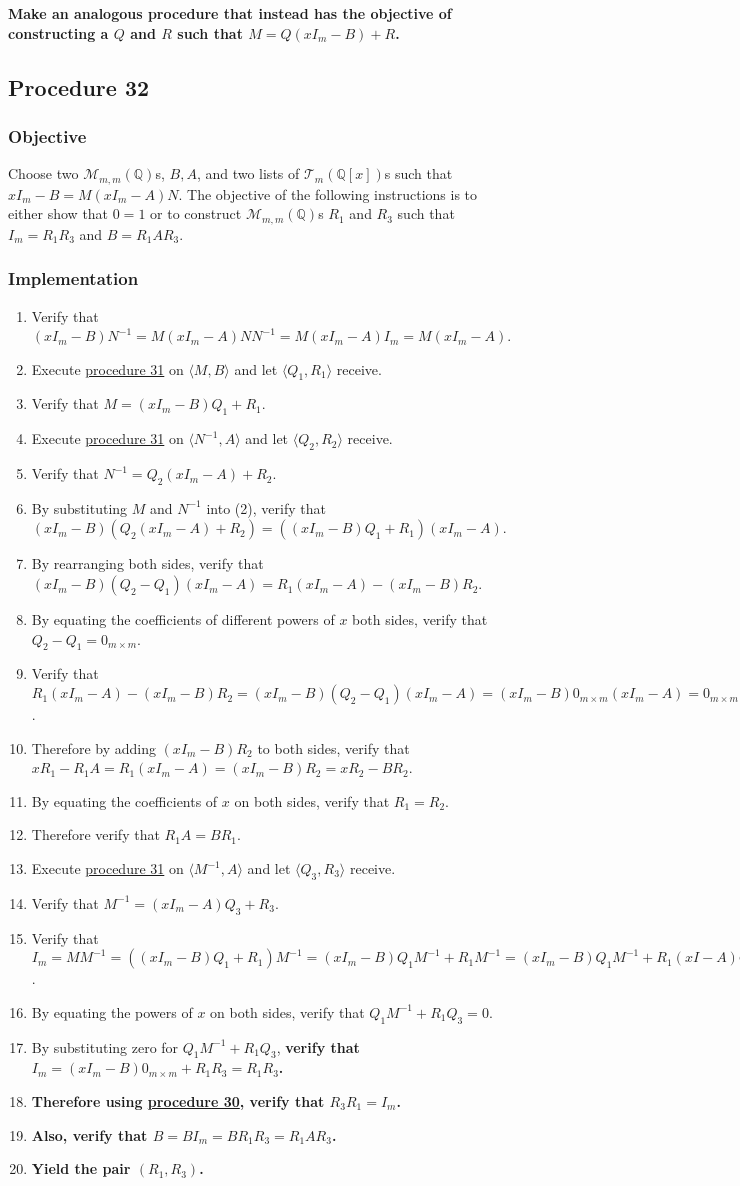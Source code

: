 \documentclass[twocolumn]{article}
\newcommand{\procedure}[2][]{\subsection*{Procedure #2 \ifthenelse{\equal{#1}{}}{}{(#1)}}\label{sec:procedure #2}}
\newcommand{\objective}{\subsubsection*{Objective}}
\newcommand{\implementation}{\subsubsection*{Implementation}}
\begin{document}
			\textbf{Make an analogous procedure that instead has the objective of constructing a $Q$ and $R$ such that $M=Q(xI_m-B)+R$.}
		\procedure{32}
			\objective
				Choose two $\mathcal{M}_{m,m}(\mathbb{Q})$s, $B,A$, and two lists of $\mathcal{T}_{m}(\mathbb{Q}[x])$s such that $xI_m-B=M(xI_m-A)N$. The objective of the following instructions is to either show that $0=1$ or to construct $\mathcal{M}_{m,m}(\mathbb{Q})$s $R_1$ and $R_3$ such that $I_m=R_1R_3$ and $B=R_1AR_3$.
			\implementation
				\begin{enumerate}
					\item Verify that $(xI_m-B)N^{-1}=M(xI_m-A)NN^{-1}=M(xI_m-A)I_m=M(xI_m-A)$.
					\item Execute \hyperref[sec:procedure 31]{procedure 31} on $\langle M,B\rangle$ and let $\langle Q_1,R_1\rangle$ receive.
					\item Verify that $M=(xI_m-B)Q_1+R_1$.
					\item Execute \hyperref[sec:procedure 31]{procedure 31} on $\langle N^{-1},A\rangle$ and let $\langle Q_2,R_2\rangle$ receive.
					\item Verify that $N^{-1}=Q_2(xI_m-A)+R_2$.
					\item By substituting $M$ and $N^{-1}$ into (2), verify that $(xI_m-B)(Q_2(xI_m-A)+R_2)=((xI_m-B)Q_1+R_1)(xI_m-A)$.
					\item By rearranging both sides, verify that $(xI_m-B)(Q_2-Q_1)(xI_m-A)=R_1(xI_m-A)-(xI_m-B)R_2$.
					\item By equating the coefficients of different powers of $x$ both sides, verify that $Q_2-Q_1=0_{m\times m}$.
					\item Verify that $R_1(xI_m-A)-(xI_m-B)R_2=(xI_m-B)(Q_2-Q_1)(xI_m-A)=(xI_m-B)0_{m\times m}(xI_m-A)=0_{m\times m}$.
					\item Therefore by adding $(xI_m-B)R_2$ to both sides, verify that $xR_1-R_1A=R_1(xI_m-A)=(xI_m-B)R_2=xR_2-BR_2$.
					\item By equating the coefficients of $x$ on both sides, verify that $R_1=R_2$.
					\item Therefore verify that $R_1A=BR_1$.
					\item Execute \hyperref[sec:procedure 31]{procedure 31} on $\langle M^{-1},A\rangle$ and let $\langle Q_3,R_3\rangle$ receive.
					\item Verify that $M^{-1}=(xI_m-A)Q_3+R_3$.
					\item Verify that $I_m=MM^{-1}=((xI_m-B)Q_1+R_1)M^{-1}=(xI_m-B)Q_1M^{-1}+R_1M^{-1}=(xI_m-B)Q_1M^{-1}+R_1(xI-A)Q_3+R_1R_3=(xI_m-B)Q_1M^{-1}+(xI-B)R_1Q_3+R_1R_3=(xI_m-B)(Q_1M^{-1}+R_1Q_3)+R_1R_3$.
					\item By equating the powers of $x$ on both sides, verify that $Q_1M^{-1}+R_1Q_3=0$.
					\item By substituting zero for $Q_1M^{-1}+R_1Q_3$, \textbf{verify that $I_m=(xI_m-B)0_{m\times m}+R_1R_3=R_1R_3$.}
					\item \textbf{Therefore using \hyperref[sec:procedure 30]{procedure 30}, verify that $R_3R_1=I_m$.}
					\item \textbf{Also, verify that $B=BI_m=BR_1R_3=R_1AR_3$.}
					\item \textbf{Yield the pair $(R_1,R_3)$.}
				\end{enumerate}
\end{document}
